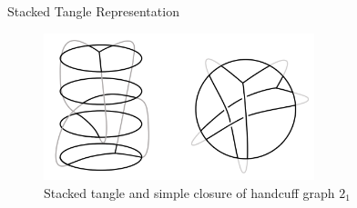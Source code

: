 \documentclass[final]{beamer}
\begin{document}
\begin{frame}[t]
\begin{columns}[t]
\begin{block}{Stacked Tangle Representation}
  \begin{figure}
      \centering
      \includegraphics[width=0.7\textwidth]{../Midterm_Poster/figure/stacked_tangle.png}
      \caption{Stacked tangle and simple closure of handcuff graph $2_1$}
  \end{figure}

  \end{block}
\end{columns}


\end{frame}
\end{document}
